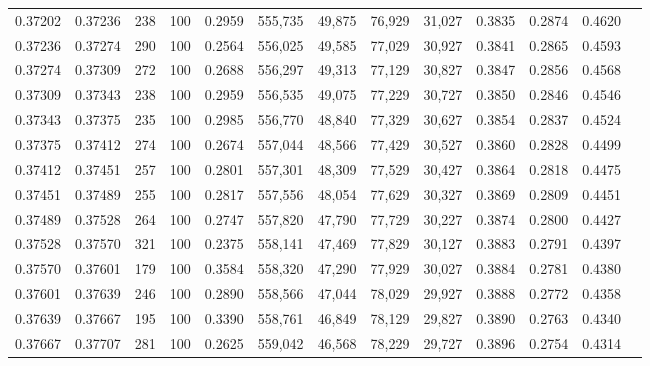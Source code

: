 \begin{tabular}{rrrrrrrrrrrrr}
0.37202 & 0.37236 &   238 & 100 &                                     0.2959 & 555,735 &  49,875 &  76,929 &  31,027 & 0.3835 & 0.2874 & 0.4620 \\
0.37236 & 0.37274 &   290 & 100 &                                     0.2564 & 556,025 &  49,585 &  77,029 &  30,927 & 0.3841 & 0.2865 & 0.4593 \\
0.37274 & 0.37309 &   272 & 100 &                                     0.2688 & 556,297 &  49,313 &  77,129 &  30,827 & 0.3847 & 0.2856 & 0.4568 \\
0.37309 & 0.37343 &   238 & 100 &                                     0.2959 & 556,535 &  49,075 &  77,229 &  30,727 & 0.3850 & 0.2846 & 0.4546 \\
0.37343 & 0.37375 &   235 & 100 &                                     0.2985 & 556,770 &  48,840 &  77,329 &  30,627 & 0.3854 & 0.2837 & 0.4524 \\
0.37375 & 0.37412 &   274 & 100 &                                     0.2674 & 557,044 &  48,566 &  77,429 &  30,527 & 0.3860 & 0.2828 & 0.4499 \\
0.37412 & 0.37451 &   257 & 100 &                                     0.2801 & 557,301 &  48,309 &  77,529 &  30,427 & 0.3864 & 0.2818 & 0.4475 \\
0.37451 & 0.37489 &   255 & 100 &                                     0.2817 & 557,556 &  48,054 &  77,629 &  30,327 & 0.3869 & 0.2809 & 0.4451 \\
0.37489 & 0.37528 &   264 & 100 &                                     0.2747 & 557,820 &  47,790 &  77,729 &  30,227 & 0.3874 & 0.2800 & 0.4427 \\
0.37528 & 0.37570 &   321 & 100 &                                     0.2375 & 558,141 &  47,469 &  77,829 &  30,127 & 0.3883 & 0.2791 & 0.4397 \\
0.37570 & 0.37601 &   179 & 100 &                                     0.3584 & 558,320 &  47,290 &  77,929 &  30,027 & 0.3884 & 0.2781 & 0.4380 \\
0.37601 & 0.37639 &   246 & 100 &                                     0.2890 & 558,566 &  47,044 &  78,029 &  29,927 & 0.3888 & 0.2772 & 0.4358 \\
0.37639 & 0.37667 &   195 & 100 &                                     0.3390 & 558,761 &  46,849 &  78,129 &  29,827 & 0.3890 & 0.2763 & 0.4340 \\
0.37667 & 0.37707 &   281 & 100 &                                     0.2625 & 559,042 &  46,568 &  78,229 &  29,727 & 0.3896 & 0.2754 & 0.4314 \\

\end{tabular}
